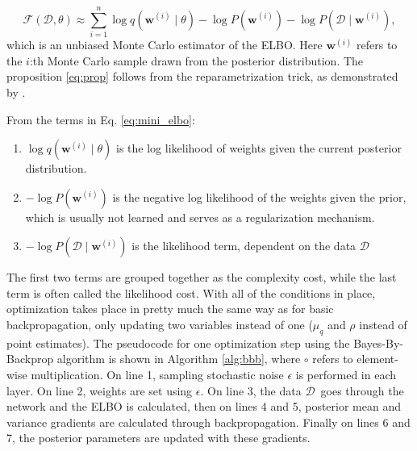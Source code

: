 	\begin{equation}
	\label{eq:mini_elbo}
	\mathcal{F}(\mathcal{D}, \theta) \approx \sum_{i=1}^{n}\log q(\pmb{w}^{(i)}\mid\theta) - \log P(\pmb{w}^{(i)}) - \log P(\mathcal{D}\mid\pmb{w}^{(i)}),
	\end{equation}
	which is an unbiased Monte Carlo estimator of the ELBO. Here $\pmb{w}^{(i)}$ refers to the $i$:th Monte Carlo sample drawn from the posterior distribution. The proposition \eqref{eq:prop} follows from the reparametrization trick, as demonstrated by \citet{blundell_weight_2015}.
	
	From the terms in Eq. \eqref{eq:mini_elbo}:
	\begin{enumerate}
		\item $\log q(\pmb{w}^{(i)} \mid \theta)$ is the log likelihood of weights given the current posterior distribution.
		
		\item $-\log P(\pmb{w}^{(i)})$ is the negative log likelihood of the weights given the prior, which is usually not learned and serves as a regularization mechanism. 
		
		\item $- \log P(\mathcal{D} \mid \pmb{w}^{(i)})$ is the likelihood term, dependent on the data $\mathcal{D}$
	\end{enumerate}
	
	\vspace*{2mm}
	The first two terms are grouped together as the complexity cost, while the last term is often called the likelihood cost. With all of the conditions in place, optimization takes place in pretty much the same way as for basic backpropagation, only updating two variables instead of one ($\mu_q$ and $\rho$ instead of point estimates). The pseudocode for one optimization step using the Bayes-By-Backprop algorithm is shown in Algorithm \ref{alg:bbb}, where $\circ$ refers to element-wise multiplication. On line 1, sampling stochastic noise $\epsilon$ is performed in each layer. On line 2, weights are set using $\epsilon$. On line 3, the data $\mathcal{D}$ goes through the network and the ELBO is calculated, then on lines 4 and 5, posterior mean and variance gradients are calculated through backpropagation. Finally on lines 6 and 7, the posterior parameters are updated with these gradients.
	
